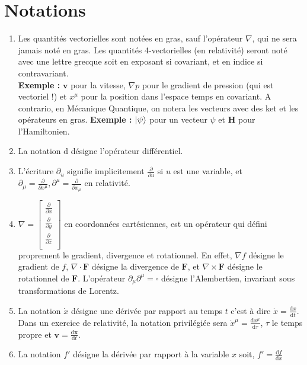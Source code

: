 \documentclass[a4paper,10pt]{report}
\begin{document}
	\section{Notations}\label{subsec:notations}
	\begin{enumerate}
		\item Les quantités vectorielles sont notées en gras, sauf l'opérateur $\nabla$, qui ne sera jamais noté en gras. Les quantités 4-vectorielles (en relativité) seront noté avec une lettre grecque soit en exposant si covariant, et en indice si contravariant. \\
		\textbf{Exemple :} $\mathbf{v}$ pour la vitesse, $\nabla p$ pour le gradient de pression (qui est vectoriel !) et $x^\mu$ pour la position dans l'espace temps en covariant. 
		A contrario, en Mécanique Quantique, on notera les vecteurs avec des ket et les opérateurs en gras.
			\textbf{Exemple :} $\ket \psi$ pour un vecteur $\psi$ et $\textbf{H}$ pour l'Hamiltonien.
		\item La notation $\text{d}$ désigne l'opérateur différentiel.
		\item L'écriture $\partial_u$ signifie implicitement $\frac{\partial}{\partial u}$ si $u$ est une variable, et $\partial_\mu = \frac{\partial}{\partial x^\mu}, \partial^\mu = \frac{\partial}{\partial x_\mu}$ en relativité.
		\item $\nabla = \begin{bmatrix}
			\frac{\partial}{\partial x}  \\
			\frac{\partial}{\partial y} \\
			\frac{\partial}{\partial z} \\
		\end{bmatrix}$ en coordonnées cartésiennes,
		est un opérateur qui défini proprement le gradient, divergence et rotationnel. En effet, $\nabla f$ désigne le gradient de $f$, $\nabla \cdot \textbf{F}$ désigne la divergence de $\textbf{F}$, et $\nabla \times \textbf{F}$ désigne le rotationnel de $\textbf{F}$.
		L'opérateur $\partial_\mu\partial^\mu = \square$ désigne l'Alembertien, invariant sous transformations de Lorentz. 
		\item La notation $\dot{x}$ désigne une dérivée par rapport au temps $t$ c'est à dire $\dot{x} = \frac{\text{d}x}{\text{d}t}$. Dans un exercice de relativité, la notation privilégiée sera $\dot x^\mu = \frac{\text{d}x^\mu}{\text{d}\tau}$, $\tau$ le temps propre et $\textbf{v}=\frac{\text{d}\textbf{x}}{\text{d}t}$.
		\item La notation $f'$ désigne la dérivée par rapport à la variable $x$ soit, $f' = \frac {\text{d}f}{\text{d}x}$

\end{enumerate}
\end{document}
